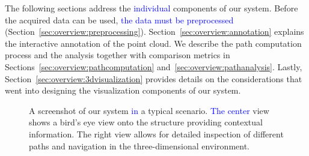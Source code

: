 \documentclass{egpubl}
\newcommand{\diff}[1]{\textcolor{blue}{#1}}
\begin{document}
The following sections address the \diff{individual} components of our system. Before the acquired data can be used, \diff{the data must be preprocessed} (Section~\ref{sec:overview:preprocessing}). Section~\ref{sec:overview:annotation} explains the interactive annotation of the point cloud. We describe the path computation process and the analysis together with comparison metrics in Sections~\ref{sec:overview:pathcomputation} and~\ref{sec:overview:pathanalysis}. Lastly, Section~\ref{sec:overview:3dvisualization} provides details on the considerations that went into designing the visualization components of our system.

\begin{figure}
	\newcommand{\abSystemScreenshotWidth}{\columnwidth}
    \centering
    \caption{A screenshot of our system \diff{in} a typical scenario. \diff{The center} view shows a bird's eye view onto the structure providing contextual information. The right view allows for detailed inspection of different paths and navigation in the three-dimensional environment.}
    \label{sec:overview:system}
\end{figure}
\end{document}
